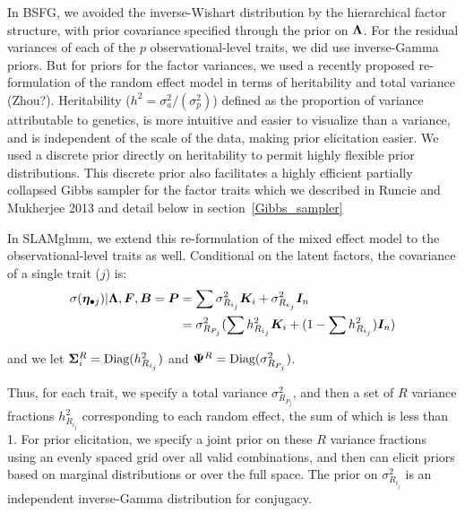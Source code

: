 \documentclass[11pt]{amsart}
\newcommand*{\B}[1]{\ifmmode\bm{#1}\else\textbf{#1}\fi}
\begin{document}
In BSFG, we avoided the inverse-Wishart distribution by the hierarchical factor structure, with prior covariance specified through the prior on $\B{\Lambda}$. For the residual variances of each of the $p$ observational-level traits, we did use inverse-Gamma priors. But for priors for the factor variances, we used a recently proposed re-formulation of the random effect model in terms of heritability and total variance (Zhou?). Heritability ($h^2 = \sigma^2_a / (\sigma^2_p)$) defined as the proportion of variance attributable to genetics, is more intuitive and easier to visualize than a variance, and is independent of the scale of the data, making prior elicitation easier. We used a discrete prior directly on heritability to permit highly flexible prior distributions. This discrete prior also facilitates a highly efficient partially collapsed Gibbs sampler for the factor traits which we described in Runcie and Mukherjee 2013 and detail below in section~\ref{Gibbs_sampler}


In SLAMglmm, we extend this re-formulation of the mixed effect model to the observational-level traits as well. Conditional on the latent factors, the covariance of a single trait ($j$) is:
\begin{align} \begin{split}
\sigma(\B{\eta}_{\bullet j}) | \B{\Lambda}, \B{F}, \B{B} = \B{P} &= \sum \sigma^2_{R_{i_j}} \B{K}_i + \sigma^2_{R_{e_j}}\B{I}_n \\
&= \sigma^2_{R_{P_j}} (\sum h^2_{R_{i_j}} \B{K}_i + (1 - \sum h^2_{R_{i_j}})\B{I}_n) 
\end{split} \end{align}

\noindent and we let $\B{\Sigma}^R_i = \mbox{Diag}(h^2_{R_{i_j}})$ and $\B{\Psi}^R = \mbox{Diag}(\sigma^2_{R_{P_j}})$.

Thus, for each trait, we specify a total variance $\sigma^2_{R_{P_j}}$, and then a set of $R$ variance fractions $h^2_{R_{i_j}}$ corresponding to each random effect, the sum of which is less than 1. For prior elicitation, we specify a joint prior on these $R$ variance fractions using an evenly spaced grid over all valid combinations, and then can elicit priors based on marginal distributions or over the full space. The prior on $\sigma^2_{R_{i_j}}$ is an independent inverse-Gamma distribution for conjugacy. 
\end{document}
